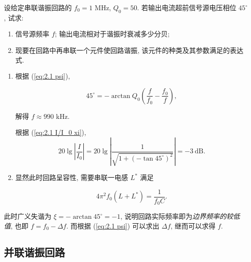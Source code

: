 \documentclass{notes}
\begin{document}
\begin{exampleprob}
    设给定串联谐振回路的 $f_0=1$ MHz, $Q_0=50$. 若输出电流超前信号源电压相位 $45^\circ$, 试求:

    \begin{enumerate}
        \item 信号源频率 $f$; 输出电流相对于谐振时衰减多少分贝;
        \item 现要在回路中再串联一个元件使回路谐振, 该元件的种类及其参数满足的表达式.
    \end{enumerate}

    \begin{solution}[1]
        \begin{enumerate}
            \item 根据 (\ref{eq:2.1 psi}),

                  \begin{equation*}
                      45^\circ=-\arctan Q_0\left(\frac{f}{f_0}-\frac{f_0}{f}\right),
                  \end{equation*}

                  解得 $f\approx 990$ kHz.

                  根据 (\ref{eq:2.1 I/I_0 xi}),
                  \question[电流衰减]
                  \begin{equation*}
                      20\lg\left|\frac{I}{I_0}\right|=20\lg\left|\frac{1}{\sqrt{1+(-\tan 45^\circ)^2}}\right|=-3\ \mathrm{dB}.
                  \end{equation*}
            \item 显然此时回路呈容性, 需要串联一电感 $L^*$ 满足

                  \begin{equation*}
                      4\pi^2 f_0(L+L^*)=\frac{1}{f_0 C}.
                  \end{equation*}
        \end{enumerate}
    \end{solution}

    \begin{solution}[2]
        此时广义失谐为 $\xi=-\arctan 45^\circ=-1$, 说明回路实际频率即为\textit{边界频率的较低值}, 也即 $f=f_0-\Delta f$. 而根据 (\ref{eq:2.1 psi}) 可以求出 $\Delta f$, 继而可以求得 $f$.
    \end{solution}
\end{exampleprob}

\subsection{并联谐振回路} \label{并联谐振回路}
\end{document}
